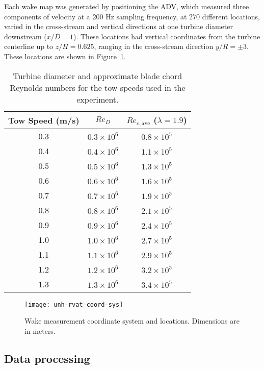 Each wake map was generated by positioning the ADV, which measured three
components of velocity at a 200 Hz sampling frequency, at 270 different
locations, varied in the cross-stream and vertical directions at one turbine
diameter downstream ($x/D=1$). These locations had vertical coordinates from the
turbine centerline up to $z/H=0.625$, ranging in the cross-stream direction $y/R
= \pm 3$. These locations are shown in Figure~\ref{fig:wake-locations}.

\begin{table}[ht]
\centering
\begin{tabular}{c|c|c}
    Tow Speed (m/s) & $Re_D$ & $Re_{c,\mathrm{ave}}$ ($\lambda = 1.9$) \\
    \hline
    0.3 & $0.3 \times 10^6$ & $0.8 \times 10^5$ \\
    0.4 & $0.4 \times 10^6$ & $1.1 \times 10^5$ \\
    0.5 & $0.5 \times 10^6$ & $1.3 \times 10^5$ \\
    0.6 & $0.6 \times 10^6$ & $1.6 \times 10^5$ \\
    0.7 & $0.7 \times 10^6$ & $1.9 \times 10^5$ \\
    0.8 & $0.8 \times 10^6$ & $2.1 \times 10^5$ \\
    0.9 & $0.9 \times 10^6$ & $2.4 \times 10^5$ \\
    1.0 & $1.0 \times 10^6$ & $2.7 \times 10^5$ \\
    1.1 & $1.1 \times 10^6$ & $2.9 \times 10^5$ \\
    1.2 & $1.2 \times 10^6$ & $3.2 \times 10^5$ \\
    1.3 & $1.3 \times 10^6$ & $3.4 \times 10^5$ \\
\end{tabular}
\caption{Turbine diameter and approximate blade chord Reynolds numbers for the
    tow speeds used in the experiment.}
\label{tab:Re}
\end{table}
\unskip


\begin{figure}
    \centering

    \texttt{[image: unh-rvat-coord-sys]}

    \caption{Wake measurement coordinate system and locations. Dimensions are in
        meters.}

    \label{fig:wake-locations}
\end{figure}


\subsection{Data processing}

